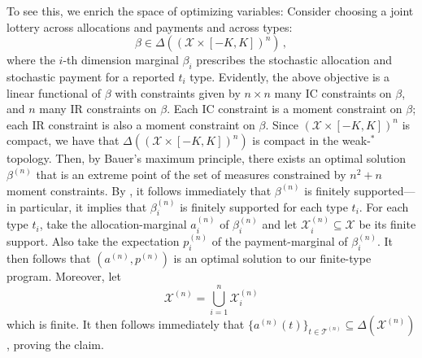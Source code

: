 \documentclass[12pt,letterpaper]{article}
\newenvironment{original}{\color{black}\noindent}{}
\theoremstyle{plain}
\theoremstyle{definition}
\theoremstyle{remark}
\renewcommand{\1}{\mathds{1}}
\newcommand{\X}{\mathcal{X}}
\theoremstyle{definition}
\begin{document}
\begin{original}
To see this, we enrich the space of optimizing variables: Consider choosing a joint lottery across allocations and payments and across types:
\[\beta \in \Delta((\X \times [-K, K])^{n})\,,\]
where the $i$-th dimension marginal $\beta_i$ prescribes the stochastic allocation and stochastic payment for a reported $t_i$ type. Evidently, the above objective is a linear functional of $\beta$ with constraints given by $n \times n$ many IC constraints on $\beta$, and $n$ many IR constraints on $\beta$. Each IC constraint is a moment constraint on $\beta$; each IR constraint is also a moment constraint on $\beta$. Since $(\X \times [-K, K])^{n}$ is compact, we have that $\Delta((\X \times [-K, K])^{n})$ is compact in the weak-$^*$ topology. Then, by Bauer's maximum principle, there exists an optimal solution $\beta^{(n)}$ that is an extreme point of the set of measures constrained by $n^2 + n$ moment constraints. By \citet{Winkler1988}, it follows immediately that $\beta^{(n)}$ is finitely supported---in particular, it implies that $\beta^{(n)}_i$ is finitely supported for each type $t_i$.  For each type $t_i$, take the allocation-marginal $a^{(n)}_i$ of $\beta^{(n)}_i$ and let $\X^{(n)}_i \subseteq \X$ be its finite support. Also take the expectation $p^{(n)}_i$ of the payment-marginal of $\beta^{(n)}_i$. It then follows that $(a^{(n)}, p^{(n)})$ is an optimal solution to our finite-type program. Moreover, let
\[\X^{(n)} = \bigcup_{i=1}^n \X^{(n)}_i\]
which is finite. It then follows immediately that $\{a^{(n)}(t)\}_{t \in \mathcal{T}^{(n)}} \subseteq \Delta(\X^{(n)})$, proving the claim.
\end{original}
\end{document}
